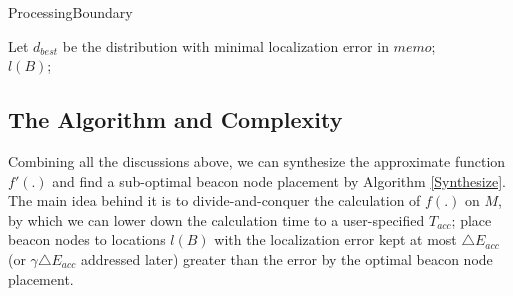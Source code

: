 \documentclass[10pt, conference, letterpaper]{IEEEtran}
\begin{document}
\begin{algorithm} \label{ProcessingBoundary}
\caption{ProcessingBoundary}
Let $d_{best}$ be the distribution with minimal localization error in $memo$;\\
\Return $l(B)$;
\end{algorithm}

\subsection{The Algorithm and Complexity} \label{synthesize_f}
Combining all the discussions above, we can synthesize the approximate function $f'(.)$ and find a sub-optimal beacon node placement by Algorithm \ref{Synthesize}. The main idea behind it is to divide-and-conquer the calculation of $f(.)$ on $M$, by which we can lower down the calculation time to a user-specified $T_{acc}$; place beacon nodes to locations $l(B)$ with the localization error kept at most $\triangle E_{acc}$ (or $\gamma \triangle E_{acc}$ addressed later) greater than the error by the optimal beacon node placement.
\end{document}
